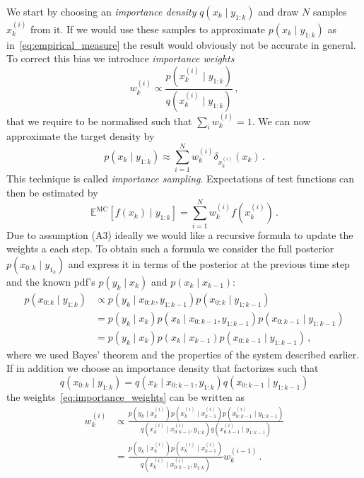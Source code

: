 We start by choosing an \emph{importance density}
$q(x_k \mid y_{1:k})$ and draw $N$ samples $x^{(i)}_k$ from it. If we
would use these samples to approximate $p(x_k \mid y_{1:k})$ as
in~\eqref{eq:empirical_measure} the result would obviously not be
accurate in general. To correct this bias we introduce
\emph{importance weights}
\begin{equation}
  \label{eq:importance_weights}
  w_k^{(i)} \propto \frac{p(x_k^{(i)} \mid y_{1:k})}{q(x_k^{(i)} \mid
    y_{1:k})} \,,
\end{equation}
that we require to be normalised such that $\sum_i w_k^{(i)} = 1$. We
can now approximate the target density by
\begin{equation}
  \label{eq:karget:approx}
  p(x_k \mid y_{1:k}) \approx \sum_{i=1}^N w_k^{(i)} \delta_{x_k^{(i)}}(x_k) \,.
\end{equation}
This technique is called \emph{importance sampling}. Expectations of
test functions can then be estimated by
\[
  \mathbb{E}^{\text{MC}}[f(x_k) \mid y_{1:k}] = \sum_{i=1}^N
  w_k^{(i)}f(x_k^{(i)}) \,.
\]
Due to assumption (A3) ideally we would like a recursive formula to
update the weights a each step. To obtain such a formula we consider
the full posterior $p(x_{0:k} \mid y_{1_k})$ and express it in terms
of the posterior at the previous time step and the known pdf's
$p(y_k \mid x_k)$ and $p(x_k \mid x_{k-1})$:
\begin{align*}
  p(x_{0:k} \mid y_{1:k}) &\propto p(y_k \mid x_{0:k}, y_{1:k-1}) p(x_{0:k} \mid y_{1:k-1}) \\
                          &= p(y_k \mid x_k) p(x_k \mid x_{0:k-1}, y_{1:k-1}) p(x_{0:k-1} \mid y_{1:k-1}) \\
                          &= p(y_k \mid x_k) p(x_k \mid x_{k-1}) p(x_{0:k-1} \mid y_{1:k-1})\,,
\end{align*}
where we used Bayes' theorem and the properties of the system
described earlier. If in addition we choose an importance density that
factorizes such that
\[
  q(x_{0:k} \mid y_{1:k}) = q(x_k \mid x_{0:k-1}, y_{1:k}) q(x_{0:k-1}
  \mid y_{1:k-1})
\]
the weights~\eqref{eq:importance_weights} can be written as
\begin{align*}
  w_k^{(i)} &\propto \frac{p(y_k \mid x_k^{(i)}) p(x_k^{(i)} \mid x_{k-1}^{(i)}) p(x_{0:k-1}^{(i)} \mid y_{1:k-1})}{q(x_k^{(i)} \mid x_{0:k-1}^{(i)}, y_{1:k}) q(x_{0:k-1}^{(i)} \mid y_{1:k-1})} \\
            &= \frac{p(y_k \mid x_k^{(i)}) p(x_k^{(i)} \mid x_{k-1}^{(i)})}{q(x_k^{(i)} \mid x_{0:k-1}^{(i)}, y_{1:k})} w^{(i-1)}_k \,.
\end{align*}
